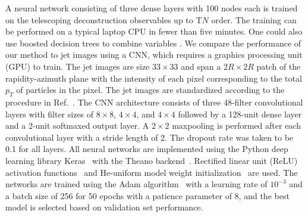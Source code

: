 \documentclass[notoc]{JHEP3}
\DeclareRobustCommand{\Ref}[1]{Ref.~\cite{#1}}
\begin{document}
A neural network consisting of three dense layers with 100 nodes each is trained on the telescoping deconstruction observables up to T$N$ order. The training can be performed on a typical laptop CPU in fewer than five minutes. One could also use boosted decision trees to combine variables \cite{Chien:2017xrb}. We compare the performance of our method to jet images using a CNN, which requires a graphics processing unit (GPU) to train. The jet images are size $33\times 33$ and span a $2R\times 2R$ patch of the rapidity-azimuth plane with the intensity of each pixel corresponding to the total $p_T$ of particles in the pixel. The jet images are standardized according to the procedure in \Ref{Komiske:2016rsd}. The CNN architecture consists of three 48-filter convolutional layers with filter sizes of $8\times 8$, $4\times 4$, and $4\times 4$ followed by a 128-unit dense layer and a 2-unit softmaxed output layer. A $2\times 2$ maxpooling is performed after each convolutional layer with a stride length of 2. The dropout rate was taken to be 0.1 for all layers. All neural networks are implemented using the Python deep learning library Keras~\cite{keras} with the Theano backend~\cite{bergstra2010theano}. Rectified linear unit (ReLU) activation functions~\cite{nair2010rectified} and He-uniform model weight initialization~\cite{heuniform} are used. The networks are trained using the Adam algorithm~\cite{adam} with a learning rate of $10^{-3}$ and a batch size of 256 for 50 epochs with a patience parameter of 8, and the best model is selected based on validation set performance.
\end{document}

